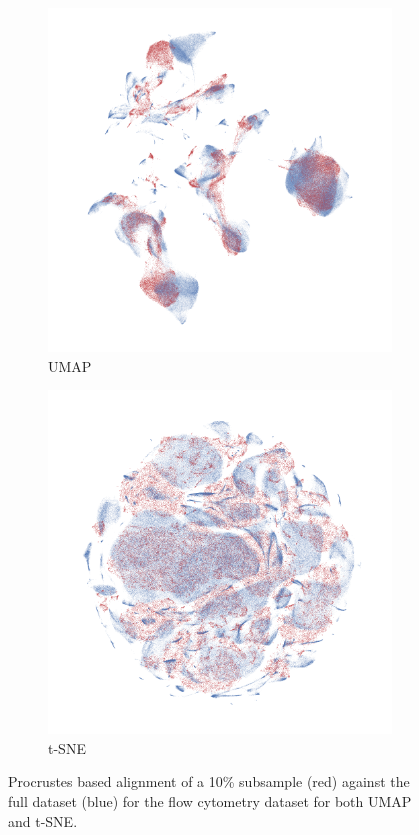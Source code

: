 \documentclass[12pt]{article}
\begin{document}
\begin{figure}
    \centering
    \begin{subfigure}{0.48\textwidth}
        \includegraphics[width=\textwidth]{umap_procrustes_align.png}
        \caption{UMAP}
    \end{subfigure}
    \begin{subfigure}{0.48\textwidth}
        \includegraphics[width=\textwidth]{tsne_procrustes_align.png}
        \caption{t-SNE}
    \end{subfigure}
    \caption{Procrustes based alignment of a 10\% subsample (red) against the full dataset (blue) for the flow cytometry dataset for both UMAP and t-SNE.}
    \label{fig:procrustes-alignment}
\end{figure}
\end{document}
